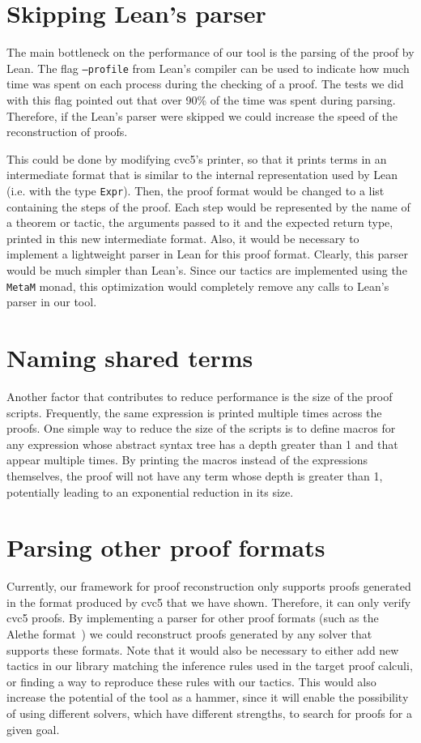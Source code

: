 \section{Skipping Lean's parser}

The main bottleneck on the performance of our tool is the parsing
of the proof by Lean. The flag \texttt{--profile} from
Lean's compiler can be used to indicate how much time was spent on each
process during the checking of a proof. The tests we did with
this flag pointed out that over 90\% of the time was spent
during parsing. Therefore, if the Lean's parser were skipped we could
increase the speed of the reconstruction of proofs.

This could be done by modifying
cvc5's printer, so that it prints terms in an intermediate format
that is similar to the internal representation used by Lean (i.e.
with the type \texttt{Expr}). Then, the proof format would be changed
to a list containing the steps of the proof. Each step would be
represented by the name of a theorem or tactic, the arguments passed to it and the expected return type, printed in
this new intermediate format. Also, it would be necessary to implement
a lightweight parser in Lean for this proof format. Clearly, this parser
would be much simpler than Lean's. Since our tactics are implemented
using the \texttt{MetaM} monad, this optimization would completely
remove any calls to Lean's parser in our tool.

\section{Naming shared terms}

Another factor that contributes to reduce performance is the size of
the proof scripts. Frequently, the same expression is printed multiple
times across the proofs. One simple way to reduce the size of the
scripts is to define macros for any expression whose abstract syntax
tree has a depth greater than 1 and that appear multiple times.
By printing the macros instead of the expressions themselves, the
proof will not have any term whose depth is greater than 1, potentially
leading to an exponential reduction in its size.

\section{Parsing other proof formats}

Currently, our framework for proof reconstruction only supports
proofs generated in the format produced by cvc5 that we have shown.
Therefore, it can only verify cvc5 proofs. By implementing a
parser for other proof formats (such
as the Alethe format~\cite{alethe}) we could reconstruct proofs
generated by any solver that supports these formats.
Note that it would also be necessary to either add
new tactics in our library matching the inference rules used in the target
proof calculi, or finding a way to reproduce these rules with our tactics.
This would also increase the potential of the tool as a hammer,
since it will enable the possibility of using different solvers,
which have different strengths, to search for proofs for a given
goal.


